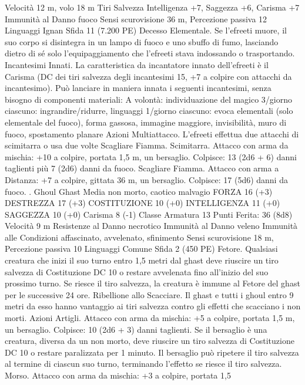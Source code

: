 \begin{multicols}{2}
Velocità 12 m, volo 18 m
Tiri Salvezza Intelligenza +7, Saggezza +6, Carisma +7
Immunità al Danno fuoco
Sensi scurovisione 36 m, Percezione passiva 12
Linguaggi Ignan
Sfida 11 (7.200 PE)
Decesso Elementale. Se l’efreeti muore, il suo corpo si
disintegra in un lampo di fuoco e uno sbuffo di fumo, lasciando
dietro di sé solo l’equipaggiamento che l’efreeti stava indossando
o trasportando.
Incantesimi Innati. La caratteristica da incantatore innato
dell’efreeti è il Carisma (DC dei tiri salvezza degli incantesimi
15, +7 a colpire con attacchi da incantesimo). Può lanciare in
maniera innata i seguenti incantesimi, senza bisogno di
componenti materiali:
A volontà: individuazione del magico
3/giorno ciascuno: ingrandire/ridurre, linguaggi
1/giorno ciascuno: evoca elementali (solo elementale del fuoco),
forma gassosa, immagine maggiore, invisibilità, muro di fuoco,
spostamento planare
Azioni
Multiattacco. L’efreeti effettua due attacchi di scimitarra o usa
due volte Scagliare Fiamma.
Scimitarra. Attacco con arma da mischia: +10 a colpire, portata
1,5 m, un bersaglio.
Colpisce: 13 (2d6 + 6) danni taglienti più 7 (2d6) danni da fuoco.
Scagliare Fiamma. Attacco con arma a Distanza: +7 a colpire,
gittata 36 m, un bersaglio.
Colpisce: 17 (5d6) danni da fuoco.
.
Ghoul
Ghast
Media non morto, caotico malvagio
FORZA 16 (+3)
DESTREZZA 17 (+3)
COSTITUZIONE 10 (+0)
INTELLIGENZA 11 (+0)
SAGGEZZA 10 (+0)
Carisma 8 (-1)
Classe Armatura 13
\hspace*{0pt}\hfill{Punti Ferita}: 36 (8d8)
Velocità 9 m
Resistenze al Danno necrotico
Immunità al Danno veleno
Immunità alle Condizioni affascinato, avvelenato, sfinimento
Sensi scurovisione 18 m, Percezione passiva 10
Linguaggi Comune
Sfida 2 (450 PE)
Fetore. Qualsiasi creatura che inizi il suo turno entro 1,5 metri dal
ghast deve riuscire un tiro salvezza di Costituzione DC 10 o restare
avvelenata fino all’inizio del suo prossimo turno. Se riesce il tiro
salvezza, la creatura è immune al Fetore del ghast per le successive
24 ore.
Ribellione allo Scacciare. Il ghast e tutti i ghoul entro 9 metri da
esso hanno vantaggio ai tiri salvezza contro gli effetti che
scacciano i non morti.
Azioni
Artigli. Attacco con arma da mischia: +5 a colpire, portata 1,5
m, un bersaglio.
Colpisce: 10 (2d6 + 3) danni taglienti. Se il bersaglio è una
creatura, diversa da un non morto, deve riuscire un tiro salvezza
di Costituzione DC 10 o restare paralizzata per 1 minuto. Il
bersaglio può ripetere il tiro salvezza al termine di ciascun suo
turno, terminando l’effetto se riesce il tiro salvezza.
Morso. Attacco con arma da mischia: +3 a colpire, portata 1,5

\end{multicols}
